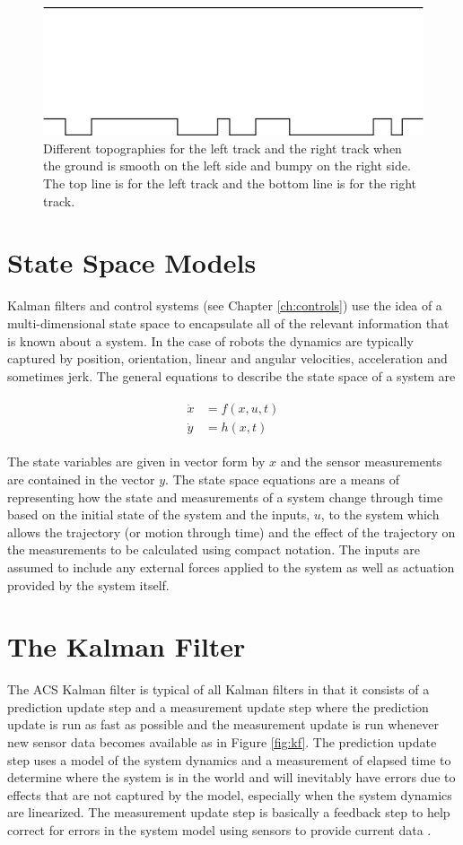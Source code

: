 \begin{figure}[ht!]
	\centering
	\includegraphics[width=.5\textwidth]{images/topography}
	\caption{Different topographies for the left track and the right track when the ground is smooth on the left side and bumpy on the right side. The top line is for the left track and the bottom line is for the right track.}
	\label{fig:topography}
\end{figure}

\section{State Space Models}
\label{sec:statespacemodels}
Kalman filters and control systems (see Chapter \ref{ch:controls}) use the idea of a multi-dimensional state space to encapsulate all of the relevant information that is known about a system. In the case of robots the dynamics are typically captured by position, orientation, linear and angular velocities, acceleration and sometimes jerk. The general equations to describe the state space of a system are

\begin{align}
\label{eq:statespace}
\begin{split}
\dot{x} &= f(x,u,t) \\
\dot{y} &= h(x,t)
\end{split}
\end{align}

The state variables are given in vector form by $x$ and the sensor measurements are contained in the vector $y$. The state space equations are a means of representing how the state and measurements of a system change through time based on the initial state of the system and the inputs, $u$, to the system which allows the trajectory (or motion through time) and the effect of the trajectory on the measurements to be calculated using compact notation. The inputs are assumed to include any external forces applied to the system as well as actuation provided by the system itself.

\section{The Kalman Filter}
\label{sec:kalmanfilter}
The ACS Kalman filter is typical of all Kalman filters in that it consists of a prediction update step and a measurement update step where the prediction update is run as fast as possible and the measurement update is run whenever new sensor data becomes available as in Figure \ref{fig:kf}. The prediction update step uses a model of the system dynamics and a measurement of elapsed time to determine where the system is in the world and will inevitably have errors due to effects that are not captured by the model, especially when the system dynamics are linearized. The measurement update step is basically a feedback step to help correct for errors in the system model using sensors to provide current data \cite{Kelly_1994_338}.

